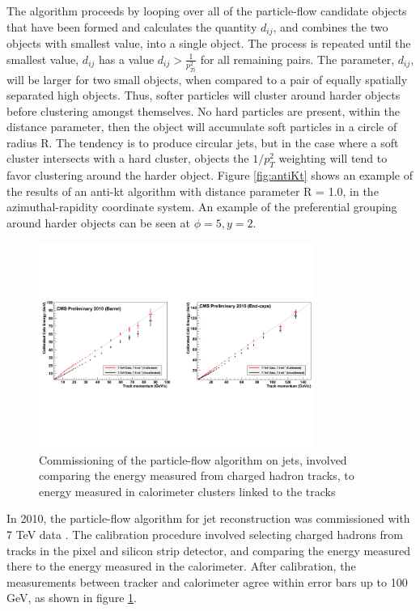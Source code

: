 \par The algorithm proceeds by looping over all of the particle-flow
candidate objects that have been formed and calculates the quantity
$d_{ij}$, and combines the two objects with smallest value, into a
single object.  The process is repeated until the smallest value,
$d_{ij}$ has a value $d_{ij} > \frac{1}{p_{Ti}^{2}}$ for all remaining
pairs.  The parameter, $d_{ij}$, will be larger for two small \PT
objects, when compared to a pair of equally spatially separated high
\PT objects.  Thus, softer particles will cluster around harder
objects before clustering amongst themselves.  No hard particles are
present, within the distance parameter, then the object will
accumulate soft particles in a circle of radius R.  The tendency is to
produce circular jets, but in the case where a soft \PT cluster intersects
with a hard \PT cluster, objects the $1/p_{T}^{2}$ weighting will tend
to favor clustering around the harder \PT object.  Figure
\ref{fig:antiKt} shows an example of the results of an anti-kt
algorithm with distance parameter R = 1.0, in the azimuthal-rapidity
coordinate system.  An example of the preferential grouping around
harder \PT objects can be seen at $\phi=5, y=2$.  

\begin{figure}[h]
   \centering
  \includegraphics[width=0.8\textwidth]{Figures/Reconstruction_Diagrams/Jets__PFChargedHadronCalibration.pdf}
  \caption{Commissioning of the particle-flow algorithm on jets,
    involved comparing the energy measured from charged hadron tracks,
  to energy measured in calorimeter clusters linked to the tracks} \label{fig:chargedHadron_calib}
\end{figure}

\par In 2010, the particle-flow algorithm for jet reconstruction was
commissioned with 7 TeV data \cite{CMS-PAS-PFT-10-002}.  The
calibration procedure involved selecting charged hadrons from tracks
in the pixel and silicon strip detector, and comparing the energy
measured there to the energy measured in the calorimeter.  After
calibration, the measurements between tracker and calorimeter agree
within error bars up to 100 GeV, as shown in figure
\ref{fig:chargedHadron_calib}. 

